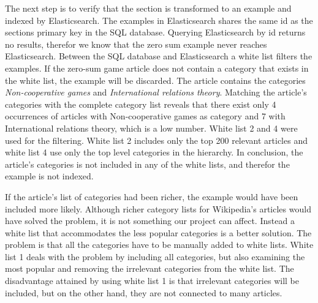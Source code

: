 The next step is to verify that the section is transformed to an example and indexed by Elasticsearch. The examples in Elasticsearch shares the same id as the sections primary key in the SQL database. Querying Elasticsearch by id returns no results, therefor we know that the zero sum example never reaches Elasticsearch. Between the SQL database and Elasticsearch a white list filters the examples. If the zero-sum game article does not contain a category that exists in the white list, the example will be discarded. The article contains the categories \textit{Non-cooperative games} and \textit{International relations theory}. Matching the article's categories with the complete category list reveals that there exist only 4 occurrences of articles with Non-cooperative games as category and 7 with International relations theory, which is a low number. White list 2 and 4 were used for the filtering. White list 2 includes only the top 200 relevant articles and white list 4 use only the top level categories in the hierarchy. In conclusion, the article's categories is not included in any of the white lists, and therefor the example is not indexed.

If the article's list of categories had been richer, the example would have been included more likely. Although richer category lists for Wikipedia's articles would have solved the problem, it is not something our project can affect. Instead a white list that accommodates the less popular categories is a better solution. The problem is that all the categories have to be manually added to white lists. White list 1 deals with the problem by including all categories, but also examining the most popular and removing the irrelevant categories from the white list. The disadvantage attained by using white list 1 is that irrelevant categories will be included, but on the other hand, they are not connected to many articles. 




\cleardoublepage